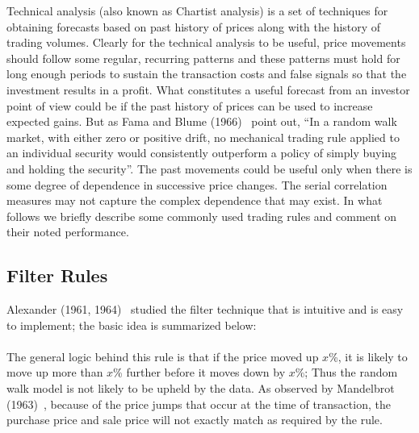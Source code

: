 Technical analysis (also known as Chartist analysis) is a set of techniques for obtaining forecasts based on past history of prices along with the history of trading volumes. Clearly for the technical analysis to be useful, price movements should follow some regular, recurring patterns and these patterns must hold for long enough periods to sustain the transaction costs and false signals so that the investment results in a profit. What constitutes a useful forecast from an investor point of view could be if the past history of prices can be used to increase expected gains. But as Fama and Blume (1966)~\cite{famablume} point out, ``In a random walk market, with either zero or positive drift, no mechanical trading rule applied to an individual security would consistently outperform a policy of simply buying and holding the security''. The past movements could be useful only when there is some degree of dependence in successive price changes. The serial correlation measures may not capture the complex dependence that may exist. In what follows we briefly describe some commonly used trading rules and comment on their noted performance.



\subsection{Filter Rules}


Alexander (1961, 1964)~\cite{alexander61,alexander64} studied the filter technique that is intuitive and is easy to implement; the basic idea is summarized below: \\


 \\


The general logic behind this rule is that if the price moved up $x$\%, it is likely to move up more than $x$\% further before it moves down by $x$\%; Thus the random walk model is not likely to be upheld by the data. As observed by Mandelbrot (1963)~\cite{mandelbrot}, because of the price jumps that occur at the time of transaction, the purchase price and sale price will not exactly match as required by the rule.


